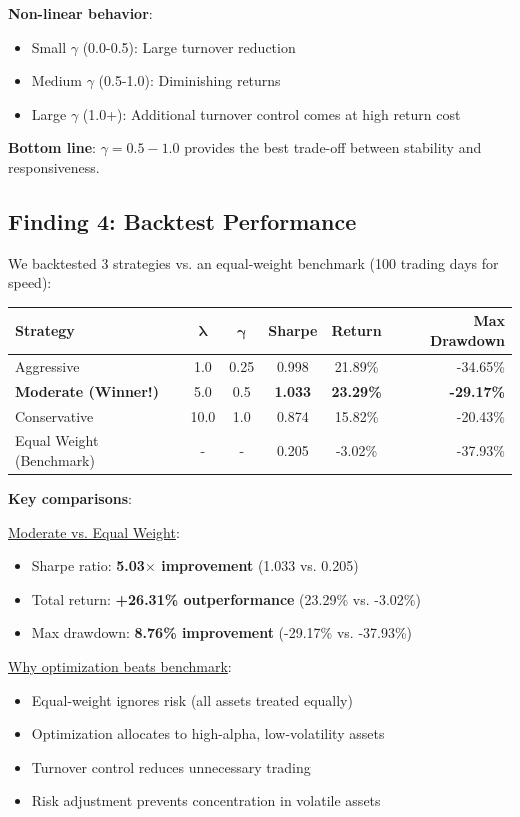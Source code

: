 \documentclass[a4paper,12pt]{article}
\begin{document}
\textbf{Non-linear behavior}:
\begin{itemize}
    \item Small $\gamma$ (0.0-0.5): Large turnover reduction
    \item Medium $\gamma$ (0.5-1.0): Diminishing returns
    \item Large $\gamma$ (1.0+): Additional turnover control comes at high return cost
\end{itemize}

\textbf{Bottom line}: $\gamma = 0.5-1.0$ provides the best trade-off between stability and responsiveness.

\subsection{Finding 4: Backtest Performance}

We backtested 3 strategies vs. an equal-weight benchmark (100 trading days for speed):

\begin{table}[H]
\centering
\begin{tabular}{lccccr}
\toprule
\textbf{Strategy} & $\boldsymbol{\lambda}$ & $\boldsymbol{\gamma}$ & \textbf{Sharpe} & \textbf{Return} & \textbf{Max Drawdown} \\
\midrule
Aggressive & 1.0 & 0.25 & 0.998 & 21.89\% & -34.65\% \\
\textbf{Moderate (Winner!)} & 5.0 & 0.5 & \textbf{1.033} & \textbf{23.29\%} & \textbf{-29.17\%} \\
Conservative & 10.0 & 1.0 & 0.874 & 15.82\% & -20.43\% \\
\midrule
Equal Weight (Benchmark) & - & - & 0.205 & -3.02\% & -37.93\% \\
\bottomrule
\end{tabular}
\end{table}

\textbf{Key comparisons}:

\underline{Moderate vs. Equal Weight}:
\begin{itemize}
    \item Sharpe ratio: \textbf{5.03$\times$ improvement} (1.033 vs. 0.205)
    \item Total return: \textbf{+26.31\% outperformance} (23.29\% vs. -3.02\%)
    \item Max drawdown: \textbf{8.76\% improvement} (-29.17\% vs. -37.93\%)
\end{itemize}

\underline{Why optimization beats benchmark}:
\begin{itemize}
    \item Equal-weight ignores risk (all assets treated equally)
    \item Optimization allocates to high-alpha, low-volatility assets
    \item Turnover control reduces unnecessary trading
    \item Risk adjustment prevents concentration in volatile assets
\end{itemize}
\end{document}
